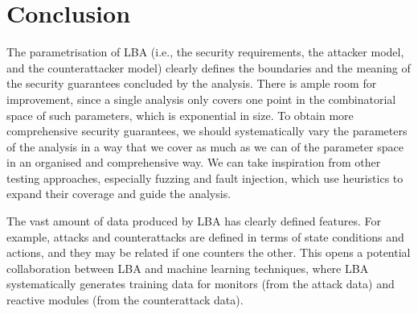 {{\section{Conclusion}
\label{sec:CPSRobustness:Conclusion} 
The parametrisation of LBA (i.e., the security requirements, the attacker model, and the counterattacker model) clearly defines the boundaries and the meaning of the security guarantees concluded by the analysis. There is ample room for improvement, since a single analysis only covers one point in the combinatorial space of such parameters, which is exponential in size. To obtain more comprehensive security guarantees, we should systematically vary the parameters of the analysis in a way that we cover as much as we can of the parameter space in an organised and comprehensive way. We can take inspiration from other testing approaches, especially fuzzing and fault injection, which use heuristics to expand their coverage and guide the analysis. 

The vast amount of data produced by LBA has clearly defined features. For example, attacks and counterattacks are defined in terms of state conditions and actions, and they may be related if one counters the other. This opens a potential collaboration between LBA and machine learning techniques, where LBA systematically generates training data for monitors (from the attack data) and reactive modules (from the counterattack data).











}}
